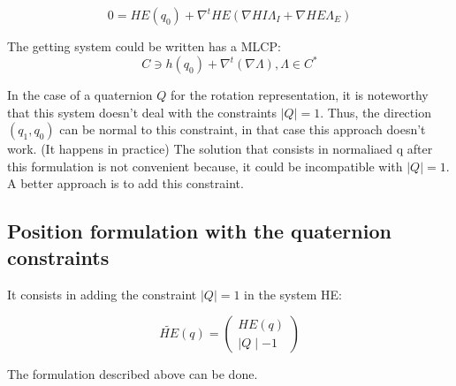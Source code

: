 \begin{equation}
  0=HE(q_0) + \nabla ^t HE (\nabla HI  \Lambda _I + \nabla HE \Lambda _E)
\end{equation}

The getting system could be written has a MLCP:
\begin{equation}
C \ni h(q_0)+ \nabla ^t(\nabla \Lambda) , \Lambda \in C^*
\end{equation}

In the case of a quaternion $Q$ for the rotation representation, it is noteworthy that this system doesn't deal with the constraints $\mid Q \mid = 1$. Thus, the direction $(q_1,q_0)$ can be normal to this constraint, in that case this approach doesn't work. (It happens in practice) The solution that consists in normaliaed q after this formulation is not convenient because, it could be incompatible with $\mid Q \mid = 1$. A better approach is to add this constraint.

\subsection {Position formulation with the quaternion constraints}
It consists in adding the constraint $\mid Q \mid = 1$ in the system HE:

\begin{equation}
  \tilde {HE}(q)= \left(\begin{array}{l}
    HE(q)\\
    \mid Q \mid -1
\end{array}\right)
\end{equation}

The formulation described above can be done. 
